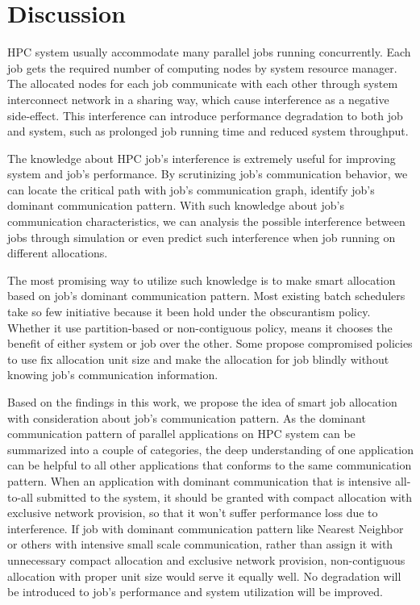 \documentclass[conference]{IEEEtran}
\begin{document}
\section{Discussion}
\label{sec:discussion}
HPC system usually accommodate many parallel jobs running concurrently. Each job gets the required number of computing nodes by system resource manager. The allocated nodes for each job communicate with each other through system interconnect network in a sharing way, which cause interference as a negative side-effect. This interference can introduce performance degradation to both job and system, such as prolonged job running time and reduced system throughput. 

The knowledge about HPC job's interference is extremely useful for improving system and job's performance. By scrutinizing job's communication behavior, we can locate the critical path with job's communication graph, identify  job's dominant communication pattern. With such knowledge about job's communication characteristics, we can analysis the possible interference between jobs through simulation or even predict such interference when job running on different allocations. 

The most promising way to utilize such knowledge is to make smart allocation based on job's dominant communication pattern. Most existing batch schedulers take so few initiative because it been hold under the obscurantism policy. Whether it use partition-based or non-contiguous policy, means it chooses the benefit of either system or job over the other. Some propose compromised policies \cite{lo}\cite{pascual}\cite{yang-cluster14} to use fix allocation unit size and  make the allocation for job blindly without knowing job's communication information. 

Based on the findings in this work, we propose the idea of smart job allocation with consideration about job's communication pattern. As the dominant communication pattern of parallel applications on HPC system can be summarized into a couple of categories, the deep understanding of one application can be helpful to all other applications that conforms to the same communication pattern. When an application with dominant communication that is intensive all-to-all submitted to the system, it should be granted with compact allocation with exclusive network provision, so that it won't suffer performance loss due to interference. If job with dominant communication pattern like Nearest Neighbor or others with intensive small scale communication, rather than assign it with unnecessary compact allocation and exclusive network provision, non-contiguous allocation with proper unit size would serve it equally well. No degradation will be introduced to job's performance and system utilization will be improved. 
\end{document}
